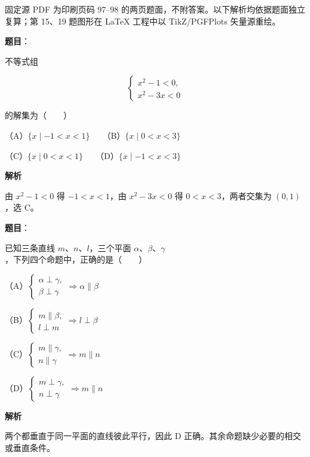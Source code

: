 

\begin{gktip}
固定源 PDF 为印刷页码 97–98 的两页题面，不附答案。以下解析均依据题面独立复算；第 15、19 题图形在 LaTeX 工程中以 TikZ/PGFPlots 矢量源重绘。
\end{gktip}


\begin{answer}

\textbf{题目}：

不等式组

\nopagebreak[4]
\[
\begin{cases}
x^2-1<0,\\
x^2-3x<0
\end{cases}
\]

的解集为\mbox{（　　）}

（A）$\{x\mid -1<x<1\}$　　（B）$\{x\mid 0<x<3\}$

（C）$\{x\mid 0<x<1\}$　　（D）$\{x\mid -1<x<3\}$

\textbf{解析}

由 $x^2-1<0$ 得 $-1<x<1$，由 $x^2-3x<0$ 得 $0<x<3$，两者交集为 $(0,1)$，选 C。


\end{answer}
\begin{answer}

\textbf{题目}：

已知三条直线 $m\text{、}n\text{、}l$，三个平面 $\alpha\text{、}\beta\text{、}\gamma$，下列四个命题中，正确的是\mbox{（　　）}

（A）$\begin{cases}\alpha\perp\gamma,\\ \beta\perp\gamma\end{cases}\Rightarrow\alpha\parallel\beta$

（B）$\begin{cases}m\parallel\beta,\\ l\perp m\end{cases}\Rightarrow l\perp\beta$

（C）$\begin{cases}m\parallel\gamma,\\ n\parallel\gamma\end{cases}\Rightarrow m\parallel n$

（D）$\begin{cases}m\perp\gamma,\\ n\perp\gamma\end{cases}\Rightarrow m\parallel n$

\textbf{解析}

两个都垂直于同一平面的直线彼此平行，因此 D 正确。其余命题缺少必要的相交或垂直条件。


\end{answer}
